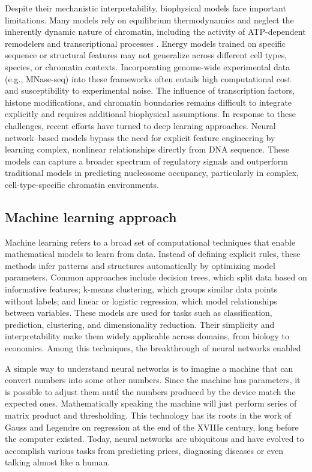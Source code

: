 \documentclass[11pt]{book}
\begin{document}
Despite their mechanistic interpretability, biophysical models face important limitations. Many models rely on equilibrium thermodynamics and neglect the inherently dynamic nature of chromatin, including the activity of ATP-dependent remodelers and transcriptional processes \cite{jiang_role_2021}. Energy models trained on specific sequence or structural features may not generalize across different cell types, species, or chromatin contexts. Incorporating genome-wide experimental data (e.g., MNase-seq) into these frameworks often entails high computational cost and susceptibility to experimental noise. The influence of transcription factors, histone modifications, and chromatin boundaries remains difficult to integrate explicitly and requires additional biophysical assumptions. In response to these challenges, recent efforts have turned to deep learning approaches. Neural network–based models bypass the need for explicit feature engineering by learning complex, nonlinear relationships directly from DNA sequence. These models can capture a broader spectrum of regulatory signals and outperform traditional models in predicting nucleosome occupancy, particularly in complex, cell-type-specific chromatin environments.



\subsection{Machine learning approach}
Machine learning refers to a broad set of computational techniques that enable mathematical models to learn from data. Instead of defining explicit rules, these methods infer patterns and structures automatically by optimizing model parameters. Common approaches include decision trees, which split data based on informative features; k-means clustering, which groups similar data points without labels; and linear or logistic regression, which model relationships between variables. These models are used for tasks such as classification, prediction, clustering, and dimensionality reduction. Their simplicity and interpretability make them widely applicable across domains, from biology to economics.
Among this techniques, the breakthrough of neural networks enabled 


\begin{tcolorbox}[title=Neural Networks principles, colframe=pink, colback=pink!10!white,coltitle=black, breakable, fonttitle=\bfseries]
    A simple way to understand neural networks is to imagine a machine that can convert numbers into some other numbers. Since the machine has parameters, it is possible to adjust them until the numbers produced by the device match the expected ones. Mathematically speaking the machine will just perform series of matrix product and thresholding. This technology has its roots in the work of Gauss and Legendre on regression at the end of the XVIIIe century, long before the computer existed.
    Today, neural networks are ubiquitous and have evolved to accomplish various tasks from predicting prices, diagnosing diseases or even talking almost like a human.
\end{tcolorbox}
\end{document}
